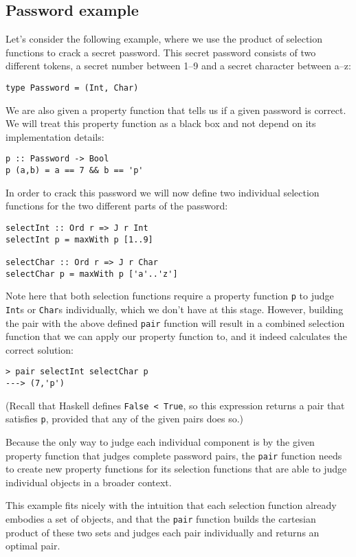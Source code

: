 \documentclass[runningheads]{llncs}
\begin{document}
\subsection{Password example}
Let's consider the following example, where we use the product of selection functions to crack a secret password. This secret password consists of two different tokens, a secret number between 1--9 and a secret character between a--z:
\begin{verbatim}
type Password = (Int, Char)
\end{verbatim}
We are also given a property function that tells us if a given password is correct. We will treat this property function as a black box and not depend on its implementation details:
\begin{verbatim}
p :: Password -> Bool
p (a,b) = a == 7 && b == 'p'
\end{verbatim}
In order to crack this password we will now define two individual selection functions for the two different parts of the password:
\begin{verbatim}
selectInt :: Ord r => J r Int
selectInt p = maxWith p [1..9]

selectChar :: Ord r => J r Char
selectChar p = maxWith p ['a'..'z']
\end{verbatim}
Note here that both selection functions require a property function \texttt{p} to judge \texttt{Int}s or \texttt{Char}s individually, which we don't have at this stage.
However, building the pair with the above defined \texttt{pair} function will result in a combined selection function that we can apply our property function to, and it indeed calculates the correct solution:
\begin{verbatim}
> pair selectInt selectChar p
---> (7,'p')
\end{verbatim}
(Recall that Haskell defines \texttt{False < True}, so this expression returns a pair that satisfies \texttt{p}, provided that any of the given pairs does so.)

Because the only way to judge each individual component is by the given property function that judges complete password pairs, the \texttt{pair} function needs to create new property functions for its selection functions that are able to judge individual objects in a broader context.

This example fits nicely with the intuition that each selection function already embodies a set of objects, and that the \texttt{pair} function builds the cartesian product of these two sets and judges each pair individually and returns an optimal pair.
%
%
%
\end{document}
